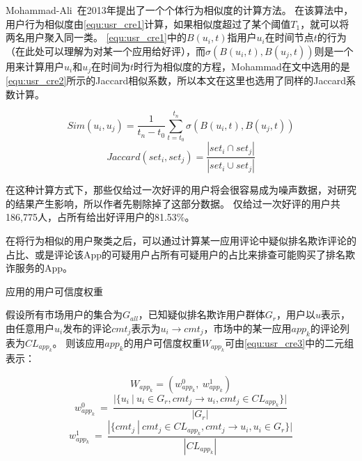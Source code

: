 Mohammad-Ali~\cite{abbasi2013measuring}在2013年提出了一个个体行为相似度的计算方法。
在该算法中，用户行为相似度由\autoref{equ:usr_cre1}计算，如果相似度超过了某个阈值$T_1$，就可以将两名用户聚入同一类。
\autoref{equ:usr_cre1}中的$B(u_i, t)$指用户$u_i$在时间节点$t$的行为（在此处可以理解为对某一个应用给好评），而$\sigma(B(u_i, t), B(u_j, t))$则是一个用来计算用户$u_i$和$u_j$在时间为$t$时行为相似度的方程，Mohammad在文中选用的是\autoref{equ:usr_cre2}所示的Jaccard相似系数，所以本文在这里也选用了同样的Jaccard系数计算。

\begin{equation}
Sim(u_i, u_j) = \frac{1}{t_n - t_0}\sum_{t=t_0}^{t_n}\sigma(B(u_i, t), B(u_j, t))
\label{equ:usr_cre1}
\end{equation}
\begin{equation}
Jaccard(set_i, set_j) = \frac{|set_i \cap set_j|}{|set_i \cup set_j|}
\label{equ:usr_cre2}
\end{equation}
\vspace{0.5mm}

在这种计算方式下，那些仅给过一次好评的用户将会很容易成为噪声数据，对研究的结果产生影响，所以作者先剔除掉了这部分数据。
仅给过一次好评的用户共186,775人，占所有给出好评用户的81.53\%。

在将行为相似的用户聚类之后，可以通过计算某一应用评论中疑似排名欺诈评论的占比、或是评论该App的可疑用户占所有可疑用户的占比来排查可能购买了排名欺诈服务的App。

\begin{Def}
	应用的用户可信度权重

	假设所有市场用户的集合为$G_{all}$，已知疑似排名欺诈用户群体$G_r$，用户以$u$表示，由任意用户$u_i$发布的评论$cmt_j$表示为$u_i \rightarrow cmt_j$，市场中的某一应用$app_k$的评论列表为$CL_{app_k}$。
	则该应用$app_k$的用户可信度权重$W_{app_k}$可由\autoref{equ:usr_cre3}中的二元组表示：
\end{Def}

\begin{equation}
	W_{app_k} = (w_{app_k}^0, ~w_{app_k}^1)
	\label{equ:usr_cre3}
\end{equation}
\begin{equation}
	w_{app_k}^0 ~ = ~ \frac{|\{u_i~|~u_i \in G_r, cmt_j \rightarrow u_i, cmt_j \in CL_{app_k}\}|}{|G_r|}
	\label{equ:usr_cre4}
\end{equation}
\begin{equation}
	w_{app_k}^1 ~ = ~ \frac{|\{cmt_j~|~cmt_j \in CL_{app_k}, cmt_j \rightarrow u_i, u_i \in G_r\}|}{|CL_{app_k}|}
	\label{equ:usr_cre5}
\end{equation}
\vspace{0.5mm}

